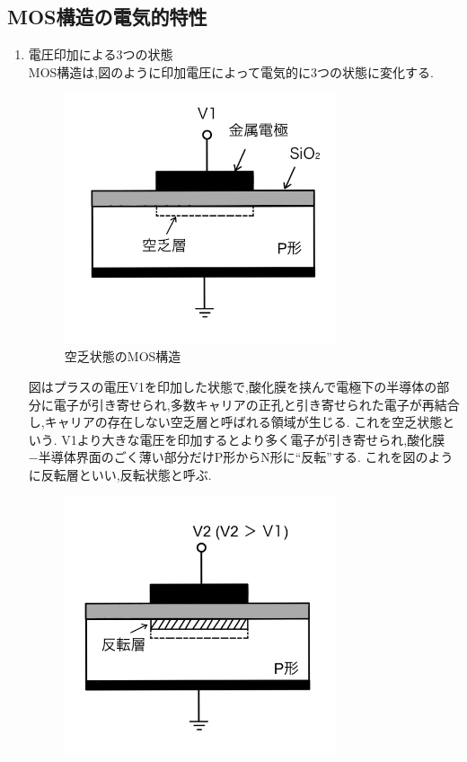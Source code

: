 \documentclass[11pt]{jarticle}
\begin{document}
	\subsection{MOS構造の電気的特性}
		\begin{enumerate}
			\item 電圧印加による3つの状態\\
				MOS構造は,図のように印加電圧によって電気的に3つの状態に変化する.
				\begin{figure}[H]
				\centering
				\includegraphics[width = 8cm]{figs/IMG_0210.JPG}
				\caption{空乏状態のMOS構造}
				\label{fig:kubouMOS}
				\end{figure}
				図はプラスの電圧V1を印加した状態で,酸化膜を挟んで電極下の半導体の部分に電子が引き寄せられ,多数キャリアの正孔と引き寄せられた電子が再結合し,キャリアの存在しない空乏層と呼ばれる領域が生じる.
				これを空乏状態という.
				V1より大きな電圧を印加するとより多く電子が引き寄せられ,酸化膜−半導体界面のごく薄い部分だけP形からN形に``反転''する.
				これを図のように反転層といい,反転状態と呼ぶ.
				\begin{figure}[H]
				\centering
				\includegraphics[width = 8cm]{figs/IMG_0211.JPG}

\end{figure}
\end{enumerate}
\end{document}
